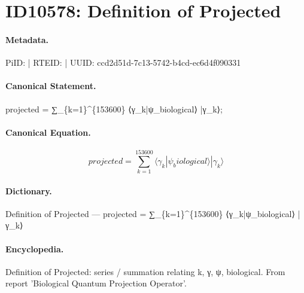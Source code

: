 \section*{ID10578: Definition of Projected}
\paragraph{Metadata.}
PiID:  | RTEID:  | UUID: ccd2d51d-7c13-5742-b4cd-ec6d4f090331

\paragraph{Canonical Statement.}
projected = ∑\_\{k=1\}\textasciicircum{}\{153600\} ⟨γ\_k|ψ\_biological⟩ |γ\_k⟩;

\paragraph{Canonical Equation.}
\[
projected = ∑_{k=1}^{153600} ⟨γ_k|ψ_biological⟩ |γ_k⟩
\]

\paragraph{Dictionary.}
Definition of Projected — projected = ∑\_\{k=1\}\textasciicircum{}\{153600\} ⟨γ\_k|ψ\_biological⟩ |γ\_k⟩

\paragraph{Encyclopedia.}
Definition of Projected: series / summation relating k, γ, ψ, biological. From report 'Biological Quantum Projection Operator'.
